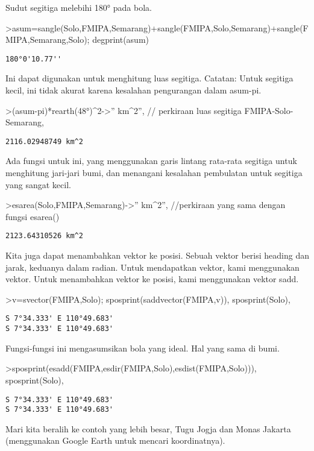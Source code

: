 \documentclass[
]{book}
\begin{document}
Sudut segitiga melebihi 180° pada bola.

\textgreater asum=sangle(Solo,FMIPA,Semarang)+sangle(FMIPA,Solo,Semarang)+sangle(FMIPA,Semarang,Solo); degprint(asum)

\begin{verbatim}
180°0'10.77''
\end{verbatim}

Ini dapat digunakan untuk menghitung luas segitiga. Catatan: Untuk segitiga kecil, ini tidak akurat karena kesalahan pengurangan dalam asum-pi.

\textgreater(asum-pi)*rearth(48°)\^{}2-\textgreater'' km\^{}2'', // perkiraan luas segitiga FMIPA-Solo-Semarang,

\begin{verbatim}
2116.02948749 km^2
\end{verbatim}

Ada fungsi untuk ini, yang menggunakan garis lintang rata-rata segitiga untuk menghitung jari-jari bumi, dan menangani kesalahan pembulatan untuk segitiga yang sangat kecil.

\textgreater esarea(Solo,FMIPA,Semarang)-\textgreater'' km\^{}2'', //perkiraan yang sama dengan fungsi esarea()

\begin{verbatim}
2123.64310526 km^2
\end{verbatim}

Kita juga dapat menambahkan vektor ke posisi. Sebuah vektor berisi heading dan jarak, keduanya dalam radian. Untuk mendapatkan vektor, kami menggunakan vektor. Untuk menambahkan vektor ke posisi, kami menggunakan vektor sadd.

\textgreater v=svector(FMIPA,Solo); sposprint(saddvector(FMIPA,v)), sposprint(Solo),

\begin{verbatim}
S 7°34.333' E 110°49.683'
S 7°34.333' E 110°49.683'
\end{verbatim}

Fungsi-fungsi ini mengasumsikan bola yang ideal. Hal yang sama di bumi.

\textgreater sposprint(esadd(FMIPA,esdir(FMIPA,Solo),esdist(FMIPA,Solo))), sposprint(Solo),

\begin{verbatim}
S 7°34.333' E 110°49.683'
S 7°34.333' E 110°49.683'
\end{verbatim}

Mari kita beralih ke contoh yang lebih besar, Tugu Jogja dan Monas Jakarta (menggunakan Google Earth untuk mencari koordinatnya).
\end{document}
